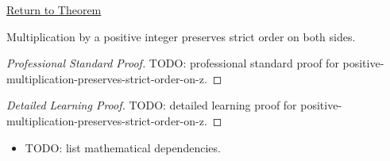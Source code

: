 \newpage
{}
\label{prf:positive-multiplication-preserves-strict-order-on-z}

\begin{remark*}[Return]
\hyperref[thm:positive-multiplication-preserves-strict-order-on-z]{Return to Theorem}
\end{remark*}

\begin{theorem*}
Multiplication by a positive integer preserves strict order on both sides.
\end{theorem*}

\begin{proof}[Professional Standard Proof]
\LRAProofBodyStart
TODO: professional standard proof for positive-multiplication-preserves-strict-order-on-z.
\end{proof}

\begin{proof}[Detailed Learning Proof]
\LRAProofBodyStart
TODO: detailed learning proof for positive-multiplication-preserves-strict-order-on-z.
\end{proof}

\begin{remark*}
\end{remark*}

\begin{dependencies}
\begin{itemize}
  \item TODO: list mathematical dependencies.
\end{itemize}
\end{dependencies}

\clearpage

